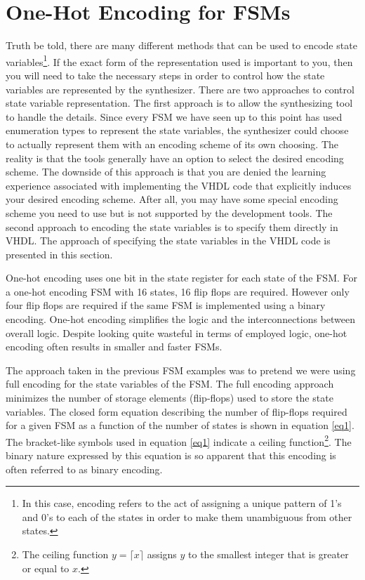 \section{One-Hot Encoding for FSMs}
Truth be told, there are many different methods that can be used to encode state variables\footnote{In this case, encoding refers to the act of assigning a unique pattern of  1's and 0's to each of the states in order to make them unambiguous from other states.}. If the exact form of the representation used is important to you, then you will need to take the necessary steps in order to control how the state variables are represented by the synthesizer. There are two approaches to control state variable representation. The first approach is to allow the synthesizing tool to handle the details. Since every FSM we have seen up to this point has used enumeration types to represent the state variables, the synthesizer could choose to actually represent them with an encoding scheme of its own choosing. The reality is that the tools generally have an option to select the desired encoding scheme. The downside of this approach is that you are denied the learning experience associated with implementing the VHDL code that explicitly induces your desired encoding scheme. After all, you may have some special encoding scheme you need to use but is not supported by the development tools. The second approach to encoding the state variables is to specify them directly in VHDL. The approach of specifying the state variables in the VHDL code is presented in this section.

One-hot encoding uses one bit in the state register for each state of the FSM. For a one-hot encoding FSM with 16 states, 16 flip flops are required. However only four flip flops are required if the same FSM is implemented using a binary encoding. One-hot encoding simplifies the logic and the interconnections between overall logic. Despite looking quite wasteful in terms of employed logic, one-hot encoding often results in smaller and faster FSMs.

The approach taken in the previous FSM examples was to pretend we were using full encoding for the state variables of the FSM. The full encoding approach minimizes the number of storage elements (flip-flops) used to store the state variables. The closed form equation describing the number of flip-flops required for a given FSM as a function of the number of states is shown in equation \ref{eq1}. The bracket-like symbols used in equation \ref{eq1} indicate a ceiling function\footnote{The ceiling function $y=\lceil x \rceil$ assigns $y$ to the smallest integer that is greater or equal to $x$.}. The binary nature expressed by this equation is so apparent that this encoding is often referred to as binary encoding.

